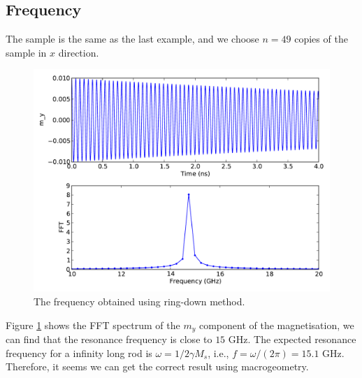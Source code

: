 \documentclass[paper=a4]{scrartcl}
\begin{document}
\subsection{Frequency}
The sample is the same as the last example, and we choose $n=49$ copies of the sample in $x$ direction. 
\begin{figure}[tbhp]
\begin{center}
\includegraphics[scale=0.46]{figure/average_fft.pdf} 
\caption{The frequency obtained using ring-down method.}
\label{fig_freq}
\end{center}
\end{figure}
Figure \ref{fig_freq} shows the FFT spectrum of the $m_y$ component of the magnetisation,  we can find that the 
resonance frequency is close to $15$ GHz.
The expected resonance frequency for a infinity long rod is $\omega = 1/2 \gamma M_s$, i.e., $f=\omega/(2 \pi) = 15.1$ GHz. Therefore, it seems 
we can get the correct result using macrogeometry. 


%
%
\end{document}
